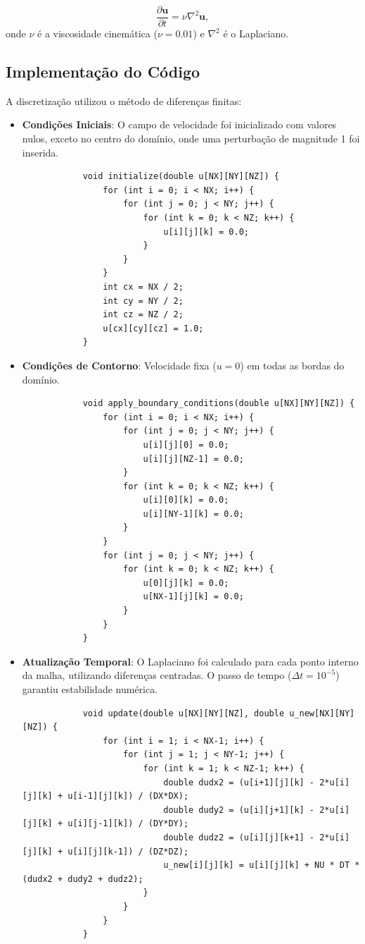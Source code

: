 \documentclass[a4paper, 12pt]{article}
\begin{document}
	\[  
	\frac{\partial \mathbf{u}}{\partial t} = \nu \nabla^2 \mathbf{u},  
	\]  
	onde \( \nu \) é a viscosidade cinemática (\( \nu = 0.01 \)) e \( \nabla^2 \) é o Laplaciano.  
	
	\subsection{Implementação do Código}  
	A discretização utilizou o método de diferenças finitas:  
	\begin{itemize}  
		\item \textbf{Condições Iniciais}: O campo de velocidade foi inicializado com valores nulos, exceto no centro do domínio, onde uma perturbação de magnitude 1 foi inserida.
		
		\begin{verbatim}
			void initialize(double u[NX][NY][NZ]) {
				for (int i = 0; i < NX; i++) {
					for (int j = 0; j < NY; j++) {
						for (int k = 0; k < NZ; k++) {
							u[i][j][k] = 0.0;
						}
					}
				}
				int cx = NX / 2;
				int cy = NY / 2;
				int cz = NZ / 2;
				u[cx][cy][cz] = 1.0;
			}
		\end{verbatim}
		  
		\item \textbf{Condições de Contorno}: Velocidade fixa (\( u = 0 \)) em todas as bordas do domínio.
		
		\begin{verbatim}
			void apply_boundary_conditions(double u[NX][NY][NZ]) {
				for (int i = 0; i < NX; i++) {
					for (int j = 0; j < NY; j++) {
						u[i][j][0] = 0.0;
						u[i][j][NZ-1] = 0.0;
					}
					for (int k = 0; k < NZ; k++) {
						u[i][0][k] = 0.0;
						u[i][NY-1][k] = 0.0;
					}
				}
				for (int j = 0; j < NY; j++) {
					for (int k = 0; k < NZ; k++) {
						u[0][j][k] = 0.0;
						u[NX-1][j][k] = 0.0;
					}
				}
			}
		\end{verbatim}
		
		\item \textbf{Atualização Temporal}: O Laplaciano foi calculado para cada ponto interno da malha, utilizando diferenças centradas. O passo de tempo (\( \Delta t = 10^{-5} \)) garantiu estabilidade numérica. 
		
		\begin{verbatim}
			void update(double u[NX][NY][NZ], double u_new[NX][NY][NZ]) {
				for (int i = 1; i < NX-1; i++) {
					for (int j = 1; j < NY-1; j++) {
						for (int k = 1; k < NZ-1; k++) {
							double dudx2 = (u[i+1][j][k] - 2*u[i][j][k] + u[i-1][j][k]) / (DX*DX);
							double dudy2 = (u[i][j+1][k] - 2*u[i][j][k] + u[i][j-1][k]) / (DY*DY);
							double dudz2 = (u[i][j][k+1] - 2*u[i][j][k] + u[i][j][k-1]) / (DZ*DZ);
							u_new[i][j][k] = u[i][j][k] + NU * DT * (dudx2 + dudy2 + dudz2);
						}
					}
				}
			}
		\end{verbatim}
		 
	\end{itemize}  
	
\end{document}
